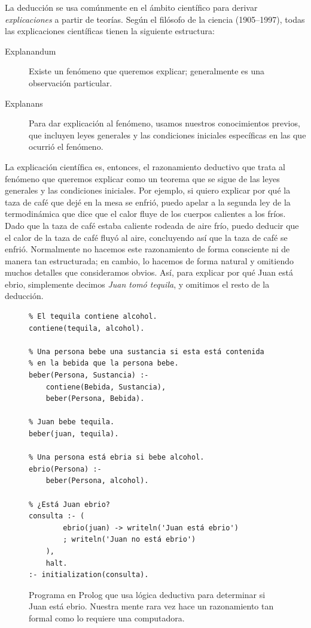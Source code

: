 La deducción se usa comúnmente en el ámbito científico para derivar
\emph{explicaciones} a partir de teorías.
Según el filósofo de la ciencia  (1905--1997),
todas las explicaciones científicas tienen la siguiente estructura:
\begin{description}
    \item[Explanandum] Existe un fenómeno que queremos explicar; generalmente
        es una observación particular.
    \item[Explanans] Para dar explicación al fenómeno, usamos nuestros
        conocimientos previos, que incluyen leyes generales y las condiciones
        iniciales específicas en las que ocurrió el fenómeno.
\end{description}

La explicación científica es, entonces, el razonamiento deductivo que trata al
fenómeno que queremos explicar como un teorema que se sigue de las leyes
generales y las condiciones iniciales.
Por ejemplo, si quiero explicar por qué la taza de café que dejé en la mesa se
enfrió, puedo apelar a la segunda ley de la termodinámica que dice que el calor
fluye de los cuerpos calientes a los fríos.
Dado que la taza de café estaba caliente rodeada de aire frío, puedo deducir que
el calor de la taza de café fluyó al aire, concluyendo así que la taza de café
se enfrió.
Normalmente no hacemos este razonamiento de forma consciente ni de manera tan
estructurada; en cambio, lo hacemos de forma natural y omitiendo muchos detalles
que consideramos obvios.
Así, para explicar por qué Juan está ebrio, simplemente decimos \emph{Juan tomó
    tequila}, y omitimos el resto de la deducción.

\begin{figure}
    \centering
    \begin{verbatim}
% El tequila contiene alcohol.
contiene(tequila, alcohol).

% Una persona bebe una sustancia si esta está contenida
% en la bebida que la persona bebe.
beber(Persona, Sustancia) :-
    contiene(Bebida, Sustancia),
    beber(Persona, Bebida).

% Juan bebe tequila.
beber(juan, tequila).

% Una persona está ebria si bebe alcohol.
ebrio(Persona) :-
    beber(Persona, alcohol).

% ¿Está Juan ebrio?
consulta :- (
        ebrio(juan) -> writeln('Juan está ebrio')
        ; writeln('Juan no está ebrio')
    ),
    halt.
:- initialization(consulta).
\end{verbatim}
    \caption{Programa en Prolog que usa lógica deductiva para determinar si
        Juan está ebrio.
        Nuestra mente rara vez hace un razonamiento tan formal como lo requiere
        una computadora.}
\end{figure}

